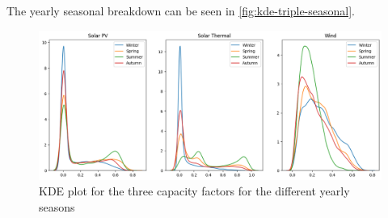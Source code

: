 The yearly seasonal breakdown can be seen in \autoref{fig:kde-triple-seasonal}. 

\begin{figure}[ht]
    \centering
    \captionsetup{justification=centering}
    \includegraphics[width=\linewidth]{assets/kde-triple-seasonal.png}
    \caption{KDE plot for the three capacity factors for the different yearly seasons}
    \label{fig:kde-triple-seasonal}
\end{figure}
